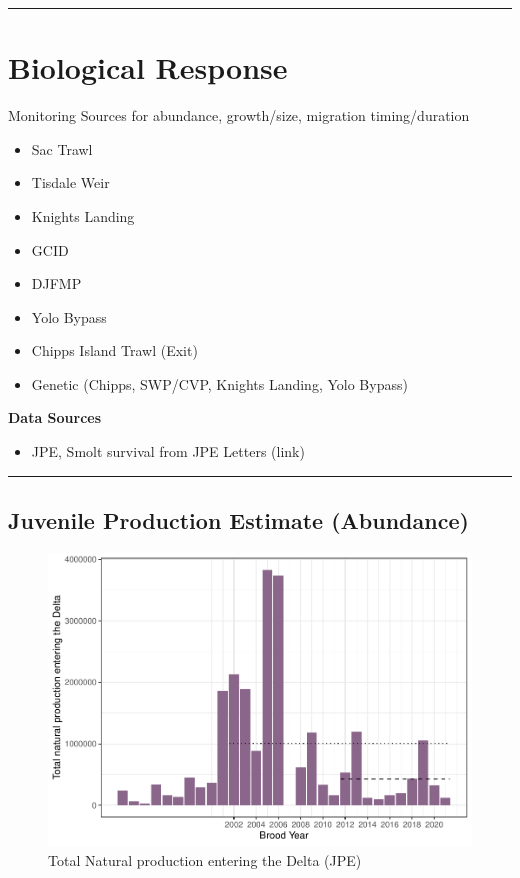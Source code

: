 \documentclass[
]{book}
\providecommand{\tightlist}{%
  \setlength{\itemsep}{0pt}\setlength{\parskip}{0pt}}
\theoremstyle{definition}
\theoremstyle{definition}
\theoremstyle{definition}
\theoremstyle{definition}
\theoremstyle{remark}
\begin{document}
\begin{center}\rule{0.5\linewidth}{0.5pt}\end{center}

\hypertarget{biological-response-3}{%
\section{Biological Response}\label{biological-response-3}}

Monitoring Sources for abundance, growth/size, migration timing/duration

\begin{itemize}
\tightlist
\item
  Sac Trawl
\item
  Tisdale Weir
\item
  Knights Landing
\item
  GCID
\item
  DJFMP
\item
  Yolo Bypass
\item
  Chipps Island Trawl (Exit)
\item
  Genetic (Chipps, SWP/CVP, Knights Landing, Yolo Bypass)
\end{itemize}

\textbf{Data Sources}

\begin{itemize}
\tightlist
\item
  JPE, Smolt survival from JPE Letters (link)
\end{itemize}

\begin{center}\rule{0.5\linewidth}{0.5pt}\end{center}

\hypertarget{juvenile-production-estimate-abundance}{%
\subsection{Juvenile Production Estimate (Abundance)}\label{juvenile-production-estimate-abundance}}

\begin{figure}
\centering
\includegraphics{_main_files/figure-latex/jpe-fig-1.pdf}
\caption{\label{fig:jpe-fig}Total Natural production entering the Delta (JPE)}
\end{figure}
\end{document}
